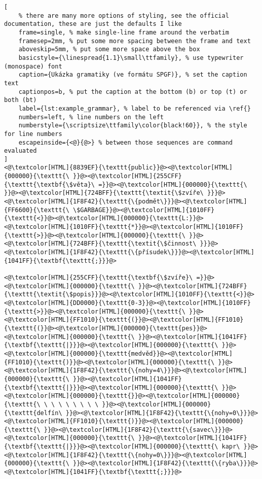 \begin{lstlisting}[
	% there are many more options of styling, see the official documentation, these are just the defaults I like
	frame=single, % make single-line frame around the verbatim
	framesep=2mm, % put some more spacing between the frame and text
	aboveskip=5mm, % put some more space above the box
	basicstyle={\linespread{1.1}\small\ttfamily}, % use typewriter (monospace) font
	caption={Ukázka gramatiky (ve formátu SPGF)}, % set the caption text
	captionpos=b, % put the caption at the bottom (b) or top (t) or both (bt)
    label={lst:example_grammar}, % label to be referenced via \ref{}
	numbers=left, % line numbers on the left
	numberstyle={\scriptsize\ttfamily\color{black!60}}, % the style for line numbers
	escapeinside={<@}{@>} % between those sequences are command evaluated
]
<@\textcolor[HTML]{8839EF}{\texttt{public}}@><@\textcolor[HTML]{000000}{\texttt{\ }}@><@\textcolor[HTML]{255CFF}{\texttt{\textbf{\$věta}\ =}}@><@\textcolor[HTML]{000000}{\texttt{\ }}@><@\textcolor[HTML]{724BFF}{\texttt{\textit{\$zvíře\ }}}@><@\textcolor[HTML]{1F8F42}{\texttt{\{podmět\}}}@><@\textcolor[HTML]{FF6600}{\texttt{\ \$GARBAGE}}@><@\textcolor[HTML]{1010FF}{\texttt{<}}@><@\textcolor[HTML]{000000}{\texttt{L:}}@><@\textcolor[HTML]{1010FF}{\texttt{*}}@><@\textcolor[HTML]{1010FF}{\texttt{>}}@><@\textcolor[HTML]{000000}{\texttt{\ }}@><@\textcolor[HTML]{724BFF}{\texttt{\textit{\$činnost\ }}}@><@\textcolor[HTML]{1F8F42}{\texttt{\{přísudek\}}}@><@\textcolor[HTML]{1041FF}{\textbf{\texttt{;}}}@>

<@\textcolor[HTML]{255CFF}{\texttt{\textbf{\$zvíře}\ =}}@><@\textcolor[HTML]{000000}{\texttt{\ }}@><@\textcolor[HTML]{724BFF}{\texttt{\textit{\$popis}}}@><@\textcolor[HTML]{1010FF}{\texttt{<}}@><@\textcolor[HTML]{DD0000}{\texttt{0-3}}@><@\textcolor[HTML]{1010FF}{\texttt{>}}@><@\textcolor[HTML]{000000}{\texttt{\ }}@><@\textcolor[HTML]{FF1010}{\texttt{(}}@><@\textcolor[HTML]{FF1010}{\texttt{(}}@><@\textcolor[HTML]{000000}{\texttt{pes}}@><@\textcolor[HTML]{000000}{\texttt{\ }}@><@\textcolor[HTML]{1041FF}{\textbf{\texttt{|}}}@><@\textcolor[HTML]{000000}{\texttt{\ }}@><@\textcolor[HTML]{000000}{\texttt{medvěd}}@><@\textcolor[HTML]{FF1010}{\texttt{)}}@><@\textcolor[HTML]{000000}{\texttt{\ }}@><@\textcolor[HTML]{1F8F42}{\texttt{\{nohy=4\}}}@><@\textcolor[HTML]{000000}{\texttt{\ }}@><@\textcolor[HTML]{1041FF}{\textbf{\texttt{|}}}@><@\textcolor[HTML]{000000}{\texttt{\ }}@>
<@\textcolor[HTML]{000000}{\texttt{}}@><@\textcolor[HTML]{000000}{\texttt{\ \ \ \ \ \ \ \ \ }}@><@\textcolor[HTML]{000000}{\texttt{delfín\ }}@><@\textcolor[HTML]{1F8F42}{\texttt{\{nohy=0\}}}@><@\textcolor[HTML]{FF1010}{\texttt{)}}@><@\textcolor[HTML]{000000}{\texttt{\ }}@><@\textcolor[HTML]{1F8F42}{\texttt{\{savec\}}}@><@\textcolor[HTML]{000000}{\texttt{\ }}@><@\textcolor[HTML]{1041FF}{\textbf{\texttt{|}}}@><@\textcolor[HTML]{000000}{\texttt{\ kapr\ }}@><@\textcolor[HTML]{1F8F42}{\texttt{\{nohy=0\}}}@><@\textcolor[HTML]{000000}{\texttt{\ }}@><@\textcolor[HTML]{1F8F42}{\texttt{\{ryba\}}}@><@\textcolor[HTML]{1041FF}{\textbf{\texttt{;}}}@>


\end{lstlisting}
